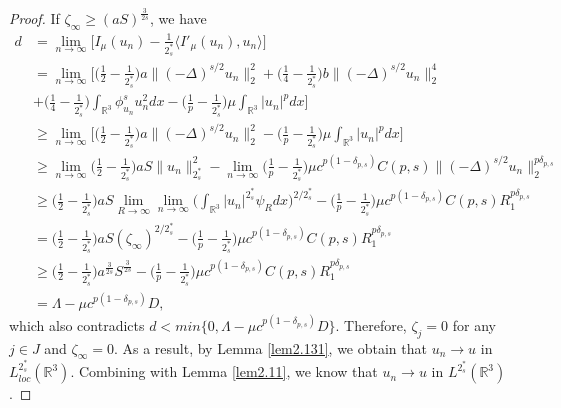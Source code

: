 \documentclass[11pt]{article}
\numberwithin{equation}{section}
\begin{document}
\begin{proof}
If $\zeta_{\infty}\geq (aS)^{\frac{3}{2s}}$, we have
\begin{align*}
d&= \lim_{n\to \infty}\Big[I_\mu(u_n)-\frac{1}{2^*_s}\langle I'_\mu(u_n),
 u_n\rangle\Big]\\
&=  \lim_{n\to \infty}\Big[\Big(\frac{1}{2}-\frac{1}{2^*_s}\Big)a\|
(-\Delta)^{s/2}u_n\|^2_2+\Big(\frac{1}{4}-\frac{1}{2^*_s}\Big)b\|(-\Delta)^{s/2}u_n\|^4_2
\\
&+\Big(\frac{1}{4}-\frac{1}{2^*_s}\Big)\int_{\mathbb{R}^3}\phi^s_{u_n}u^2_ndx
 -\Big(\frac{1}{p}-\frac{1}{2^*_s}\Big)\mu \int_{\mathbb{R}^3}|u_n|^pdx\Big]\\
&\geq  \lim_{n\to \infty}\Big[\Big(\frac{1}{2}-\frac{1}{2^*_s}\Big)a
\|(-\Delta)^{s/2}u_n\|^2_2-\Big(\frac{1}{p}-\frac{1}{2^*_s}\Big)
 \mu \int_{\mathbb{R}^3}|u_n|^pdx\Big]\\
&\geq \lim_{n\to \infty}\Big(\frac{1}{2}-\frac{1}{2^*_s}\Big)aS\|u_n\|^2_{2^*_s}
 -{\lim_{n\to \infty}}\Big(\frac{1}{p}-\frac{1}{2^*_s}\Big)
 \mu c^{p(1-\delta_{p,s})}C(p,s)\|(-\Delta)^{s/2}u_n\|^{p\delta_{p,s}}_2\\
&\geq \Big(\frac{1}{2}-\frac{1}{2^*_s}\Big)aS\lim_{R\to \infty}
 \lim_{n\to \infty}\Big(\int_{\mathbb{R}^3}|u_n|^{2^*_s}\psi_R dx\Big)^{2/2^*_s}
  -\Big(\frac{1}{p}-\frac{1}{2^*_s}\Big)\mu c^{p(1-\delta_{p,s})}C(p,s)
  R_1^{p\delta_{p,s}}\\
&= \Big(\frac{1}{2}-\frac{1}{2^*_s}\Big)aS(\zeta_\infty)^{2/2^*_s}
 -\Big(\frac{1}{p}-\frac{1}{2^*_s}\Big)\mu c^{p(1-\delta_{p,s})}C(p,s)
  R_1^{p\delta_{p,s}}\\
&\geq  \Big(\frac{1}{2}-\frac{1}{2^*_s}\Big) a^{\frac{3}{2s}}S^{\frac{3}{2s}}
 -\Big(\frac{1}{p}-\frac{1}{2^*_s}\Big)\mu c^{p(1-\delta_{p,s})}C(p,s)
 R_1^{p\delta_{p,s}}\\
&= \Lambda-\mu c^{p(1-\delta_{p,s})}D,
\end{align*}
which also contradicts $d<min\{0, \Lambda-\mu c^{p(1-\delta_{p,s})}D\}$.
Therefore, $\zeta_j=0$ for any $j\in J$ and $\zeta_\infty=0$. As a result,
by Lemma \ref{lem2.131}, we obtain that $u_n\to u$ in $L^{2^*_s}_{loc}(\mathbb{R}^3)$.
Combining with Lemma \ref{lem2.11}, we know that $u_n\to u$ in
$L^{2^*_s}(\mathbb{R}^3)$.


\end{proof}
\end{document}
